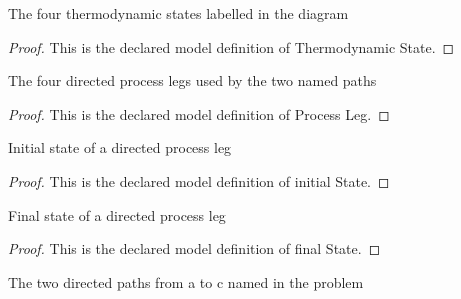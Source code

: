 \begin{definition}
  \label{def:physics:phyx-mini-0341:phyxminiproblems-problemphyxmini0341-thermodynamicstate}
  The four thermodynamic states labelled in the diagram
\end{definition}
\begin{proof}
  This is the declared model definition of Thermodynamic State.
\end{proof}
\begin{definition}
  \label{def:physics:phyx-mini-0341:phyxminiproblems-problemphyxmini0341-processleg}
  The four directed process legs used by the two named paths
\end{definition}
\begin{proof}
  This is the declared model definition of Process Leg.
\end{proof}
\begin{definition}
  \label{def:physics:phyx-mini-0341:phyxminiproblems-problemphyxmini0341-processleg-initialstate}
  Initial state of a directed process leg
\end{definition}
\begin{proof}
  This is the declared model definition of initial State.
\end{proof}
\begin{definition}
  \label{def:physics:phyx-mini-0341:phyxminiproblems-problemphyxmini0341-processleg-finalstate}
  Final state of a directed process leg
\end{definition}
\begin{proof}
  This is the declared model definition of final State.
\end{proof}
\begin{definition}
  \label{def:physics:phyx-mini-0341:phyxminiproblems-problemphyxmini0341-thermodynamicpath}
  The two directed paths from a to c named in the problem
\end{definition}
